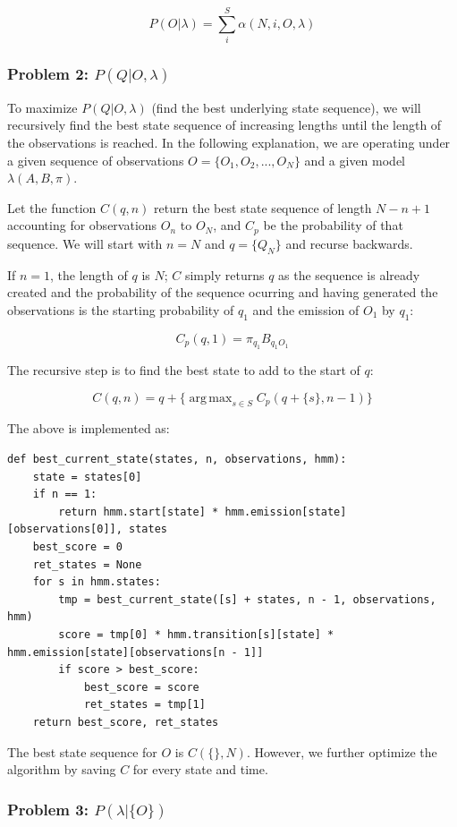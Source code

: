 \documentclass[11pt,a4paper]{article}
\DeclareMathOperator*{\argmax}{arg\,max}
\begin{document}
\[
P(O|\lambda) = \sum_i^S{\alpha(N, i, O, \lambda)}
\]

\subsubsection{Problem 2: $P(Q|O, \lambda)$}
\label{Hidden Markov Models:Problem 2}

To maximize $P(Q|O, \lambda)$ (find the best underlying state sequence), we will recursively find the best state sequence of increasing lengths until the length of the observations is reached. In the following explanation, we are operating under a given sequence of observations $O = \{O_1, O_2, ..., O_N\}$ and a given model $\lambda(A, B, \pi)$.

Let the function $C(q, n)$ return the best state sequence of length $N - n + 1$ accounting for observations $O_n$ to $O_N$, and $C_p$ be the probability of that sequence. We will start with $n = N$ and $q = \{Q_N\}$ and recurse backwards.

If $n = 1$, the length of $q$ is $N$; $C$ simply returns $q$ as the sequence is already created and the probability of the sequence ocurring and having generated the observations is the starting probability of $q_1$ and the emission of $O_1$ by $q_1$:

\[
C_p(q, 1) = \pi_{q_1} B_{{q_1}{O_1}}
\]

The recursive step is to find the best state to add to the start of $q$:

\[
C(q, n) = q + \{\argmax_{s \in S} C_p(q + \{s\}, n - 1)\}
\]

The above is implemented as:

\begin{lstlisting}
def best_current_state(states, n, observations, hmm):
    state = states[0]
    if n == 1:
        return hmm.start[state] * hmm.emission[state][observations[0]], states
    best_score = 0
    ret_states = None
    for s in hmm.states:
        tmp = best_current_state([s] + states, n - 1, observations, hmm)
        score = tmp[0] * hmm.transition[s][state] * hmm.emission[state][observations[n - 1]]
        if score > best_score:
            best_score = score
            ret_states = tmp[1]
    return best_score, ret_states
\end{lstlisting}

The best state sequence for $O$ is $C(\{\}, N)$. However, we further optimize the algorithm by saving $C$ for every state and time.

\subsubsection{Problem 3: $P(\lambda|\{O\})$}
\label{Hidden Markov Models:Problem 3}
\end{document}
